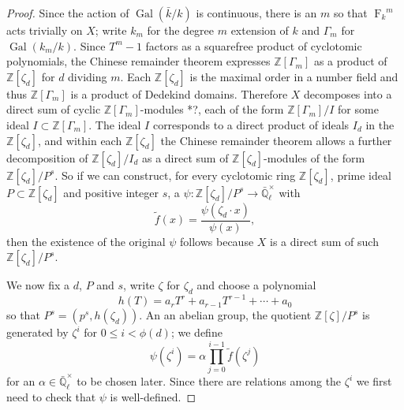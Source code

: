 \documentclass[11pt]{amsart}
\theoremstyle{plain}
\theoremstyle{definition}
\theoremstyle{remark}
\newcommand{\ZZ}{{\mathbb{Z}}}
\newcommand{\EE}{\mathbb{\bar Q}_\ell}
\newcommand{\bFq}{\bar{k}}
\newcommand{\Fq}{k}
\newcommand{\Fqm}{k_m}
\newcommand{\EEx}{\EE^\times}
\DeclareMathOperator{\Gal}{Gal}
\newcommand{\Frob}[1]{{\operatorname{F}_{#1}}}
\begin{document}
\begin{proof}
  Since the action of $\Gal(\bFq/\Fq)$ is continuous, there is an $m$
  so that $\Frob{\Fq}^m$ acts trivially on $X$; write $\Fqm$ for the degree
  $m$ extension of $\Fq$ and $\Gamma_m$ for $\Gal(\Fqm/\Fq)$.  Since
  $T^m-1$ factors as a squarefree product of cyclotomic polynomials,
  the Chinese remainder theorem expresses $\ZZ[\Gamma_m]$ as a product
  of $\ZZ[\zeta_d]$ for $d$ dividing $m$.  Each $\ZZ[\zeta_d]$ is the
  maximal order in a number field and thus $\ZZ[\Gamma_m]$ is a
  product of Dedekind domains.  Therefore $X$ decomposes into a direct
  sum of cyclic $\ZZ[\Gamma_m]$-modules \cite{Brandal}*{?}, each of the
  form $\ZZ[\Gamma_m] / I$ for some ideal $I \subset \ZZ[\Gamma_m]$.
  The ideal $I$ corresponds to a direct product of ideals $I_d$ in the
  $\ZZ[\zeta_d]$, and within each $\ZZ[\zeta_d]$ the Chinese remainder
  theorem allows a further decomposition of $\ZZ[\zeta_d] / I_d$ as a
  direct sum of $\ZZ[\zeta_d]$-modules of the form $\ZZ[\zeta_d]/P^s$.
  So if we can construct, for every cyclotomic ring $\ZZ[\zeta_d]$,
  prime ideal $P \subset \ZZ[\zeta_d]$ and positive integer $s$, a
  $\psi \colon \ZZ[\zeta_d]/P^s \rightarrow \EEx$ with
  \begin{equation} \label{eq:psi-condition}
    \tilde{f}(x) = \frac{\psi(\zeta_d \cdot x)}{\psi(x)},
  \end{equation}
  then the existence of the original $\psi$ follows because $X$ is a
  direct sum of such $\ZZ[\zeta_d]/P^s$.

  We now fix a $d$, $P$ and $s$, write $\zeta$ for $\zeta_d$ and
  choose a polynomial
  $$h(T) = a_rT^r + a_{r-1}T^{r-1} + \cdots + a_0$$
  so that $P^s = (p^s, h(\zeta_d))$.
  An an abelian group, the quotient $\ZZ[\zeta] / P^s$ is generated by
  $\zeta^i$ for $0 \le i < \phi(d)$; we define
  \begin{equation} \label{eq:psi-def}
    \psi(\zeta^i) = \alpha \prod_{j=0}^{i-1} \tilde{f}(\zeta^j)
  \end{equation}
  for an $\alpha \in \EEx$ to be chosen later.  Since there are
  relations among the $\zeta^i$ we first need to check that $\psi$ is
  well-defined.


\end{proof}
\end{document}
